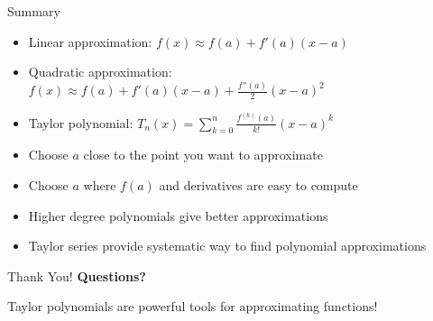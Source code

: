 \documentclass[aspectratio=169]{beamer}
\begin{document}
\begin{frame}{Summary}
\begin{itemize}
    \item Linear approximation: $f(x) \approx f(a) + f'(a)(x-a)$
    \item Quadratic approximation: $f(x) \approx f(a) + f'(a)(x-a) + \frac{f''(a)}{2}(x-a)^2$
    \item Taylor polynomial: $T_n(x) = \sum_{k=0}^{n} \frac{f^{(k)}(a)}{k!}(x-a)^k$
    \item Choose $a$ close to the point you want to approximate
    \item Choose $a$ where $f(a)$ and derivatives are easy to compute
    \item Higher degree polynomials give better approximations
    \item Taylor series provide systematic way to find polynomial approximations
\end{itemize}
\end{frame}

\begin{frame}{Thank You!}
\centering
\vspace{2cm}
{\Huge \textcolor{myblue}{\textbf{Questions?}}}

\vspace{1cm}
{\Large Taylor polynomials are powerful tools for approximating functions!}
\end{frame}
\end{document}
